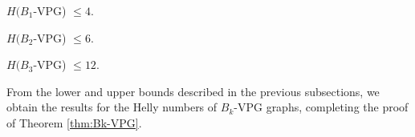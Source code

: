 \begin{claim}\label{claim:upper-B1-VPG}
$H(B_1$-VPG) $\leq  4$.
\end{claim}


\begin{claim}\label{claim:upper-B2-VPG}
$H(B_2$-VPG)  $\leq  6$.
\end{claim}



\begin{claim}\label{claim:upper-B3-VPG}
$H(B_3$-VPG) $\leq  12$.
\end{claim}


From the lower and upper bounds described in the previous subsections, we obtain the results for the Helly numbers of $B_k$-VPG graphs, completing the proof of Theorem \ref{thm:Bk-VPG}.

